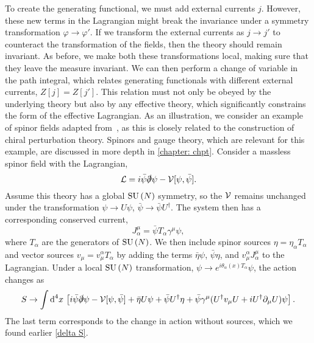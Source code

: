 To create the generating functional, we must add external currents $j$.
However, these new terms in the Lagrangian might break the invariance under a symmetry transformation $\varphi \rightarrow \varphi'$.
If we transform the external currents as $j \rightarrow j'$ to counteract the transformation of the fields, then the theory should remain invariant.
As before, we make both these transformations local, making sure that they leave the measure invariant.
We can then perform a change of variable in the path integral, which relates generating functionals with different external currents, $Z[j] = Z[j']$.
This relation must not only be obeyed by the underlying theory but also by any effective theory, which significantly constrains the form of the effective Lagrangian.
As an illustration, we consider an example of spinor fields adapted from~\autocite{schererIntroductionChiralPerturbation2002}, as this is closely related to the construction of chiral perturbation theory.
Spinors and gauge theory, which are relevant for this example, are discussed in more depth in \autoref{chapter: chpt}.
Consider a massless spinor field with the Lagrangian,
%
\begin{equation}
    \mathcal{L} = i \bar \psi \slashed \partial \psi - \mathcal{V}[\psi, \bar \psi].
\end{equation}
%
Assume this theory has a global $\text{SU}\left(N\right)$ symmetry, so the $\mathcal{V}$ remains unchanged under the transformation $\psi \rightarrow U \psi$, $\bar \psi \rightarrow \bar \psi U^\dagger$.
The system then has a corresponding conserved current,
%
\begin{equation}
    J_\alpha^\mu = \bar \psi T_\alpha \gamma^\mu \psi,
\end{equation}
%
where $T_\alpha$ are the generators of $\text{SU}\left(N\right)$.
We then include spinor sources $\eta = \eta_\alpha T_\alpha$ and vector sources $v_\mu = v_\mu^\alpha T_\alpha$ by adding the terms $ \bar \eta \psi$, $\bar \psi \eta$, and $v_\mu^\alpha J^\mu_\alpha$ to the Lagrangian.
Under a local $\text{SU}\left(N\right)$ transformation, $\psi \rightarrow e^{i\theta_\alpha(x)T_\alpha} \psi$, the action changes as
%
\begin{equation}
    S \rightarrow 
    \int \text{d}^4 x \,
    \left[
        i \bar \psi \slashed \partial \psi 
        - \mathcal{V}[\psi, \bar \psi]
        + \bar \eta U \psi
        + \bar \psi U^\dagger \eta 
        + \bar \psi \gamma^\mu (U^\dagger v_\mu U + i U^\dagger \partial_\mu U)\psi
    \right].
\end{equation}
%
The last term corresponds to the change in action without sources, which we found earlier \autoref{delta S}.
